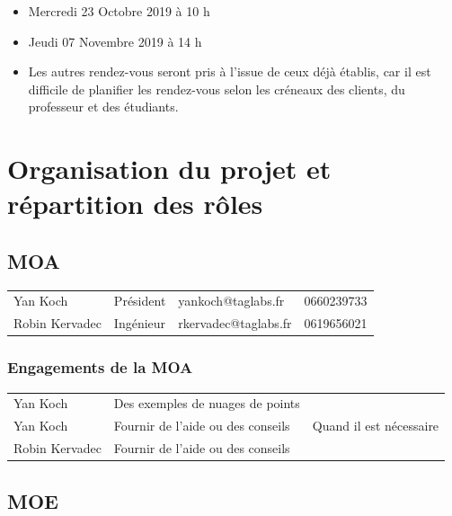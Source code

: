 \documentclass[12pt,titlepage,french]{article}
\begin{document}
\begin{itemize}
  \item Mercredi 23 Octobre 2019 à 10 h
  \item Jeudi 07 Novembre 2019 à 14 h
  \item Les autres rendez-vous seront pris à l'issue de ceux déjà établis, car il est difficile de planifier les rendez-vous selon les créneaux des clients, du professeur et des étudiants.
\end{itemize}


\section{Organisation du projet et répartition des rôles}

\subsection*{MOA}

\noindent\begin{tabu} to \textwidth {X[c]X[c]X[c]X[c]}\toprule
   &&        &\\\toprule
      Yan Koch&   Président&  yankoch@taglabs.fr&    0660239733\\\midrule
Robin Kervadec&   Ingénieur&rkervadec@taglabs.fr&    0619656021\\\bottomrule
\end{tabu}




\subsubsection*{Engagements de la MOA}

\noindent\begin{tabu} to \textwidth {X[c]X[c2]X[c2]}\toprule
{}&                    &\\\toprule
      Yan Koch& Des exemples de nuages de points&\\\midrule
      Yan Koch&Fournir de l'aide ou des conseils&Quand il est nécessaire\\\midrule
Robin Kervadec&Fournir de l'aide ou des conseils&\\\bottomrule
\end{tabu}

\subsection*{MOE}
\end{document}
